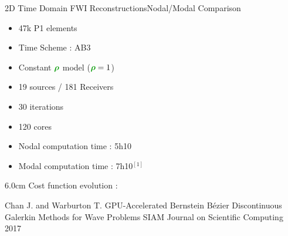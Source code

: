 \begin{frame}{2D Time Domain FWI Reconstructions}{Nodal/Modal Comparison}

  \begin{multicols}{2}
    \begin{itemize}
    \item 47k P1 elements
    \item Time Scheme : AB3
    \item Constant $\density$ model ($\density=1$)
    \item 19 sources / 181 Receivers
    \item 30 iterations
    \item 120 cores
    \item Nodal computation time : 5h10
    \item Modal computation time : 7h10$^{[1]}$
    \end{itemize}
    \columnbreak

    \setlength{\plotwidth} {6.0cm}
    \setlength{\plotheight}{5cm}
    Cost function evolution :
   \begin{figure}
      \end{figure}
  \end{multicols}

  \vfill
  \tiny
  \begin{thebibliography}{1}
   Chan J. and Warburton T.
    \newblock GPU-Accelerated Bernstein Bézier Discontinuous Galerkin Methods for Wave Problems
    \newblock SIAM Journal on Scientific Computing 2017
  \end{thebibliography}
\end{frame}





